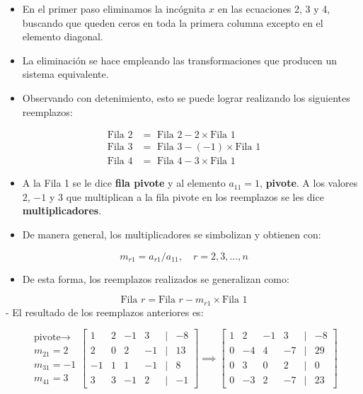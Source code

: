 \documentclass[openany]{book}
\providecommand{\tightlist}{%
  \setlength{\itemsep}{0pt}\setlength{\parskip}{0pt}}
\begin{document}
\begin{itemize}
\tightlist
\item
  En el primer paso eliminamos la incógnita \(x\) en las ecuaciones 2, 3 y 4, buscando que queden ceros en toda la primera columna excepto en el elemento diagonal.
\item
  La eliminación se hace empleando las transformaciones que producen un sistema equivalente.
\item
  Observando con detenimiento, esto se puede lograr realizando los siguientes reemplazos:
\end{itemize}

\[
\begin{array}{cl}
\text{Fila 2} &= \text{ Fila 2} - 2 \times \text{Fila 1} \\ 
\text{Fila 3} &= \text{ Fila 3} - (-1) \times \text{Fila 1} \\
\text{Fila 4} &= \text{ Fila 4} - 3 \times \text{Fila 1} 
\end{array}
\]

\begin{itemize}
\tightlist
\item
  A la Fila 1 se le dice \textbf{fila pivote} y al elemento \(a_{11}=1\), \textbf{pivote}. A los valores \(2\), \(-1\) y \(3\) que multiplican a la fila pivote en los reemplazos se les dice \textbf{multiplicadores}.
\item
  De manera general, los multiplicadores se simbolizan y obtienen con:
\end{itemize}

\[m_{r1} = a_{r1} / a_{11}, \quad r = 2, 3, ..., n\]

\begin{itemize}
\tightlist
\item
  De esta forma, los reemplazos realizados se generalizan como:
\end{itemize}

\[\text{Fila } r = \text{Fila } r - m_{r1} \times \text{Fila 1}\]
- El resultado de los reemplazos anteriores es:

\[
\begin{matrix}
\text{pivote} \rightarrow \\ m_{21} = 2 \\ m_{31} = -1 \\ m_{41} = 3
\end{matrix}
\begin{bmatrix}
1 & 2 & -1 & 3 &|& -8\\
2 & 0 & 2 & -1 &|& 13\\
-1 & 1 & 1 & -1 &|& 8\\
3 & 3 & -1 & 2 &|& -1  
\end{bmatrix}
\implies
\begin{bmatrix}
1 & 2 & -1 & 3 &|& -8\\
0 & -4 & 4 & -7 &|& 29\\
0 & 3 & 0 & 2 &|& 0\\
0 & -3 & 2 & -7 &|& 23  
\end{bmatrix}
\]
\end{document}

